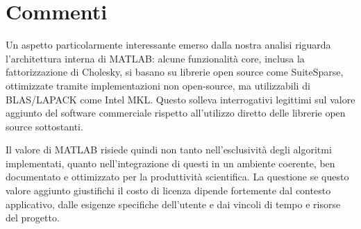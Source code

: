 \section{Commenti}

Un aspetto particolarmente interessante emerso dalla nostra analisi riguarda l'architettura interna di MATLAB: alcune funzionalità core, 
inclusa la fattorizzazione di Cholesky, si basano su librerie open source come SuiteSparse, ottimizzate tramite implementazioni 
non open-source, ma utilizzabili di BLAS/LAPACK come Intel MKL. Questo solleva interrogativi legittimi sul valore aggiunto del software commerciale 
rispetto all'utilizzo diretto delle librerie open source sottostanti.

Il valore di MATLAB risiede quindi non tanto nell'esclusività degli algoritmi implementati, quanto nell'integrazione di questi in un 
ambiente coerente, ben documentato e ottimizzato per la produttività scientifica. La questione se questo valore aggiunto giustifichi il 
costo di licenza dipende fortemente dal contesto applicativo, dalle esigenze specifiche dell'utente e dai vincoli di tempo e risorse del 
progetto.
